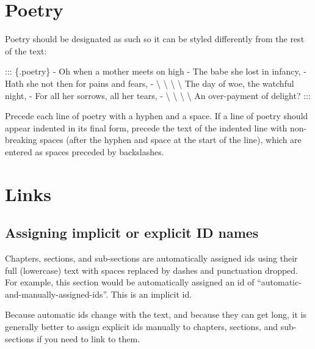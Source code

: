 \documentclass[
]{book}
\newenvironment{Shaded}{\begin{snugshade}}{\end{snugshade}}
\newcommand{\NormalTok}[1]{#1}
\newcommand{\SpecialStringTok}[1]{\textcolor[rgb]{0.31,0.60,0.02}{#1}}
\begin{document}
\hypertarget{poetry}{%
\chapter{Poetry}\label{poetry}}

Poetry should be designated as such so it can be styled differently from the rest of the text:

\begin{Shaded}
\begin{Highlighting}[]
\NormalTok{::: \{.poetry\}}
\SpecialStringTok{{-} }\NormalTok{Oh when a mother meets on high}
\SpecialStringTok{{-} }\NormalTok{The babe she lost in infancy,}
\SpecialStringTok{{-} }\NormalTok{Hath she not then for pains and fears,}
\SpecialStringTok{{-} }\NormalTok{\textbackslash{} \textbackslash{} \textbackslash{} \textbackslash{} The day of woe, the watchful night,}
\SpecialStringTok{{-} }\NormalTok{For all her sorrows, all her tears,}
\SpecialStringTok{{-} }\NormalTok{\textbackslash{} \textbackslash{} \textbackslash{} \textbackslash{} An over{-}payment of delight?}
\NormalTok{:::}
\end{Highlighting}
\end{Shaded}

Precede each line of poetry with a hyphen and a space. If a line of poetry should appear indented in its final form, precede the text of the indented line with non-breaking spaces (after the hyphen and space at the start of the line), which are entered as spaces preceded by backslashes.

\hypertarget{links}{%
\chapter{Links}\label{links}}

\hypertarget{assigning-ids}{%
\section{Assigning implicit or explicit ID names}\label{assigning-ids}}

Chapters, sections, and sub-sections are automatically assigned ids using their full (lowercase) text with spaces replaced by dashes and punctuation dropped. For example, this section would be automatically assigned an id of ``automatic-and-manually-assigned-ids''. This is an implicit id.

Because automatic ids change with the text, and because they can get long, it is generally better to assign explicit ids manually to chapters, sections, and sub-sections if you need to link to them.
\end{document}
